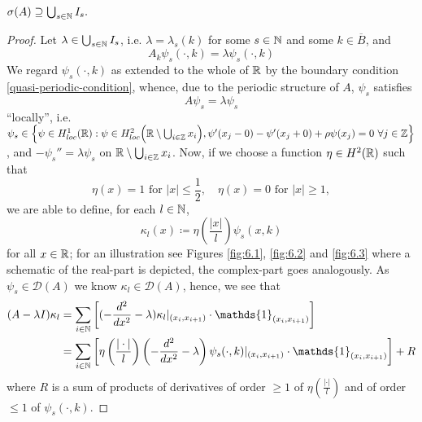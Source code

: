\begin{theorem} \label{4.1:thm-MainResult.FirstInclusion}
	$\sigma(A) \supseteq \bigcup_{s \in \mathbb{N}} I_{s}.$
	
	\begin{proof}
		Let $\lambda \in \bigcup_{s \in \mathbb{N}} I_{s}$, i.e. $\lambda = \lambda_{s}(k)$ for some $s \in \mathbb{N}$ and some $k \in \overline{B}$, and 
		\begin{equation}
			A_{k} \psi_{s}(\cdot, k) = \lambda \psi_{s}(\cdot, k) \label{firstinclusion-firstequation} 
		\end{equation} 
		We regard $\psi_{s}(\cdot, k)$ as extended to the whole of $\mathbb{R}$ by the boundary condition \eqref{quasi-periodic-condition}, whence, due to the periodic structure of $A$, $\psi_{s}$ satisfies
		\[ A \psi_{s} = \lambda \psi_{s} \]
		\enquote{locally}, i.e. $\psi_{s} \in \Big\{ \psi \in  H^{1}_{loc}(\mathbb{R}) : \psi \in H^{2}_{loc}\Big(\mathbb{R} \setminus \bigcup_{i \in \mathbb{Z}} x_{i} \Big), \psi'(x_{j} - 0) - \psi'(x_{j} + 0) + \rho  \psi(x_{j}) = 0 ~\forall j \in \mathbb{Z} \Big\}$, and $ -\psi_{s}'' = \lambda \psi_{s}$ on $\mathbb{R} \setminus \bigcup_{i \in \mathbb{Z}} x_{i}$. Now, if we choose a function $\eta \in H^{2}(\mathbb{R})$ such that 
			\begin{equation}
				\eta(x) = 1 \text{ for } |x| \leq \frac{1}{2}, \quad \eta(x) = 0 \text{ for } |x| \geq 1, \label{eta}
			\end{equation} 
		we are able to define, for each $l \in \mathbb{N}$,
			\[ \kappa_{l}(x) \coloneqq \eta\left(\frac{|x|}{l}\right) \psi_{s}(x, k) \]		
	 	for all $x \in \mathbb{R}$; for an illustration see Figures \ref{fig:6.1}, \ref{fig:6.2} and \ref{fig:6.3} where a schematic of the real-part is depicted, the complex-part goes analogously. As $\psi_{s} \in \mathcal{D}(A)$ we know $\kappa_{l} \in \mathcal{D}(A)$, hence, we see that
		\begin{align}
			(A - \lambda I) \kappa_{l} & = \sum_{i \in \N} \left[ (- \frac{d^{2}}{dx^{2}} - \lambda) \kappa_{l}|_{(x_{i}, x_{i+1})} \cdot \mathds{1}_{(x_{i}, x_{i+1})} \right] \label{eq:sepofspectraleq} \\
				& = \sum_{i \in \N} \left[ \eta\left(\frac{|\cdot|}{l}\right) \left(- \frac{d^{2}}{dx^{2}} - \lambda \right) \psi_{s}(\cdot, k) |_{(x_{i}, x_{i+1})} \cdot \mathds{1}_{(x_{i}, x_{i+1})} \right] + R \notag
		\end{align}
		where $R$ is a sum of products of derivatives of order $\geq 1$ of $\eta\left(\frac{|\cdot|}{l}\right)$ and of order $\leq 1$ of $\psi_{s}(\cdot, k)$. 
		

\end{proof}
\end{theorem}
